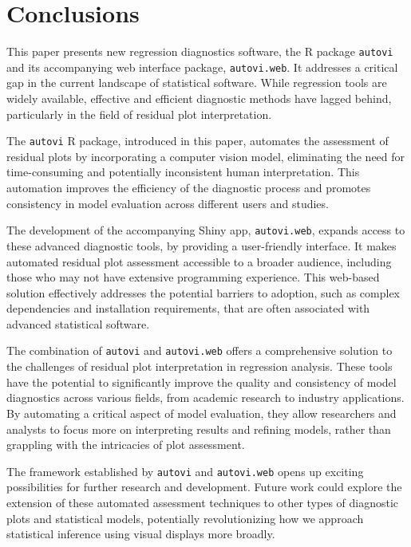 \documentclass[
doublespace,
  times]{anzsauth}
\begin{document}
\section{Conclusions}\label{sec-autovi-conclusion}

This paper presents new regression diagnostics software, the R package
\texttt{autovi} and its accompanying web interface package,
\texttt{autovi.web}. It addresses a critical gap in the current
landscape of statistical software. While regression tools are widely
available, effective and efficient diagnostic methods have lagged
behind, particularly in the field of residual plot interpretation.

The \texttt{autovi} R package, introduced in this paper, automates the
assessment of residual plots by incorporating a computer vision model,
eliminating the need for time-consuming and potentially inconsistent
human interpretation. This automation improves the efficiency of the
diagnostic process and promotes consistency in model evaluation across
different users and studies.

The development of the accompanying Shiny app, \texttt{autovi.web},
expands access to these advanced diagnostic tools, by providing a
user-friendly interface. It makes automated residual plot assessment
accessible to a broader audience, including those who may not have
extensive programming experience. This web-based solution effectively
addresses the potential barriers to adoption, such as complex
dependencies and installation requirements, that are often associated
with advanced statistical software.

The combination of \texttt{autovi} and \texttt{autovi.web} offers a
comprehensive solution to the challenges of residual plot interpretation
in regression analysis. These tools have the potential to significantly
improve the quality and consistency of model diagnostics across various
fields, from academic research to industry applications. By automating a
critical aspect of model evaluation, they allow researchers and analysts
to focus more on interpreting results and refining models, rather than
grappling with the intricacies of plot assessment.

The framework established by \texttt{autovi} and \texttt{autovi.web}
opens up exciting possibilities for further research and development.
Future work could explore the extension of these automated assessment
techniques to other types of diagnostic plots and statistical models,
potentially revolutionizing how we approach statistical inference using
visual displays more broadly.
\end{document}
